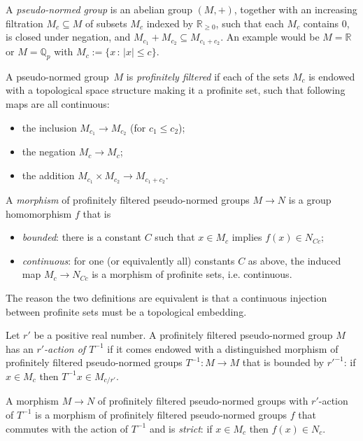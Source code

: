 \begin{definition}
  \label{pseudo_normed_group}
  \leanok
  A \emph{pseudo-normed group} is an abelian group $(M,+)$,
  together with an increasing filtration $M_c \subseteq M$ of subsets $M_c$ indexed by $\mathbb R_{\ge 0}$,
  such that each $M_c$ contains $0$, is closed under negation,
  and $M_{c_1} + M_{c_2} \subseteq M_{c_1 + c_2}$. An example would be $M=\mathbb{R}$ or $M=\mathbb{Q}_p$ with $M_c :=\{x\,:\,|x|\leq c\}$.

  A pseudo-normed group~$M$ is \emph{profinitely filtered}
  if each of the sets $M_c$ is endowed with a topological space structure
  making it a profinite set, such that following maps are all continuous:
  \begin{itemize}
    \item the inclusion $M_{c_1} \to M_{c_2}$ (for $c_1 \le c_2$);
    \item the negation $M_c \to M_c$;
    \item the addition $M_{c_1} \times M_{c_2} \to M_{c_1 + c_2}$.
  \end{itemize}

  
  A \emph{morphism} of profinitely filtered pseudo-normed groups $M \to N$
  is a group homomorphism $f$ that is
  \begin{itemize}
    \item \emph{bounded}:
      there is a constant $C$
      such that $x \in M_c$ implies $f(x) \in N_{Cc}$;
    \item \emph{continuous}:
      for one (or equivalently all) constants $C$ as above,
      the induced map $M_c \to N_{Cc}$ is
      a morphism of profinite sets, i.e. continuous.
  \end{itemize}

  The reason the two definitions are equivalent is that a continuous injection between profinite sets must be a topological embedding.
\end{definition}

\begin{definition}
  \label{profinitely_filtered_pseudo_normed_group_with_Tinv}
  \leanok
  Let $r'$ be a positive real number.
  A profinitely filtered pseudo-normed group $M$
  has an \emph{$r'$-action of $T^{-1}$}
  if it comes endowed with a distinguished morphism
  of profinitely filtered pseudo-normed groups
  $T^{-1} \colon M \to M$
  that is bounded by $r'^{-1}$:
  if $x \in M_c$ then $T^{-1}x \in M_{c/r'}$.

  A morphism $M \to N$
  of profinitely filtered pseudo-normed groups with $r'$-action of $T^{-1}$
  is a morphism of profinitely filtered pseudo-normed groups $f$
  that commutes with the action of $T^{-1}$
  and is \emph{strict}: if $x \in M_c$ then $f(x) \in N_c$.
\end{definition}

